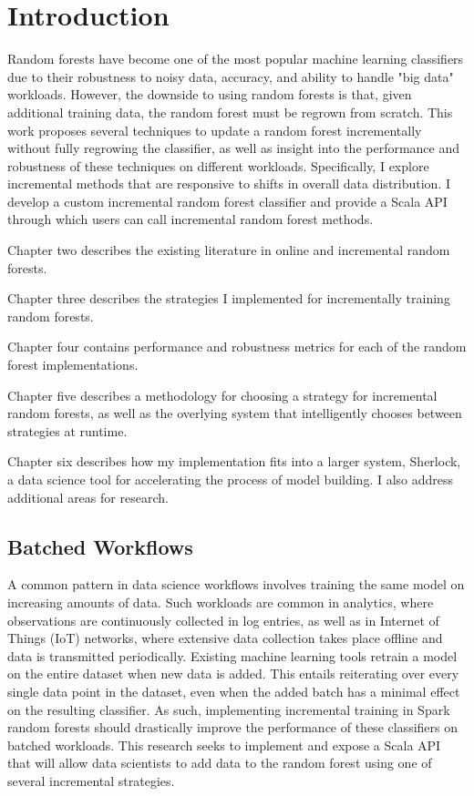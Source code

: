 \chapter{Introduction}
Random forests have become one of the most popular machine learning classifiers
due to their robustness to noisy data, accuracy, and ability to handle "big
data" workloads. However, the downside to using random forests is that, given
additional training data, the random forest must be regrown from scratch. This
work proposes several techniques to update a random forest incrementally
without fully regrowing the classifier, as well as insight into the performance
and robustness of these techniques on different workloads. Specifically, I
explore incremental methods that are responsive to shifts in overall data
distribution. I develop a custom incremental random forest classifier and
provide a Scala API through which users can call incremental random forest
methods.

Chapter two describes the existing literature in online and incremental random
forests.

Chapter three describes the strategies I implemented for incrementally training
random forests.

Chapter four contains performance and robustness metrics for each of the random
forest implementations.

Chapter five describes a methodology for choosing a strategy for incremental
random forests, as well as the overlying system that intelligently chooses
between strategies at runtime.

Chapter six describes how my implementation fits into a larger system,
Sherlock, a data science tool for accelerating the process of model building. I
also address additional areas for research.

\section{Batched Workflows}

A common pattern in data science workflows involves training the same model on
increasing amounts of data. Such workloads are common in analytics, where
observations are continuously collected in log entries, as well as in Internet
of Things (IoT) networks, where extensive data collection takes place offline
and data is transmitted periodically. Existing machine learning tools retrain a
model on the entire dataset when new data is added. This entails reiterating
over every single data point in the dataset, even when the added batch has a
minimal effect on the resulting classifier. As such, implementing incremental
training in Spark random forests should drastically improve the performance of
these classifiers on batched workloads. This research seeks to implement and
expose a Scala API that will allow data scientists to add data to the random
forest using one of several incremental strategies. 

